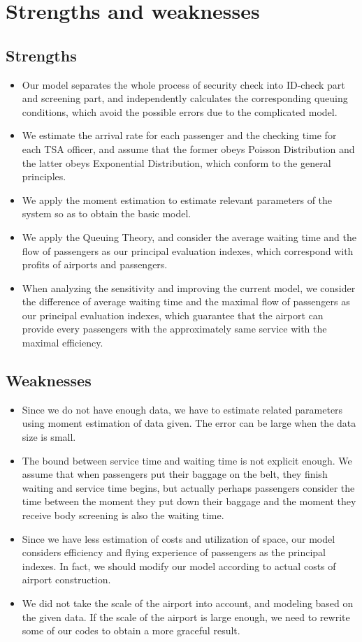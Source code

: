 \documentclass{mcmthesis}
\begin{document}
	\section{Strengths and weaknesses}
	\subsection{Strengths}
	\begin{itemize}
		\item Our model separates the whole process of security check into ID-check part and screening part, and independently calculates the corresponding queuing conditions, which avoid the possible errors due to the complicated model.
		\item We estimate the arrival rate for each passenger and the checking time for each TSA officer, and assume that the former obeys Poisson Distribution and the latter obeys Exponential Distribution, which conform to the general principles.
		\item We apply the moment estimation to estimate relevant parameters of the system so as to obtain the basic model.
		\item We apply the Queuing Theory, and consider the average waiting time and the flow of passengers as our principal evaluation indexes, which correspond with profits of airports and passengers.
		\item When analyzing the sensitivity and improving the current model, we consider the difference of average waiting time and the maximal flow of passengers as our principal evaluation indexes, which guarantee that the airport can provide every passengers with the approximately same service with the maximal efficiency.
	\end{itemize}
	\subsection{Weaknesses}
	\begin{itemize}
		\item Since we do not have enough data, we have to estimate related parameters using moment estimation of data given. The error can be large when the data size is small.
		\item The bound between service time and waiting time is not explicit enough. We assume that when passengers put their baggage on the belt, they finish waiting and service time begins, but actually perhaps passengers consider the time between the moment they put down their baggage and the moment they receive body screening is also the waiting time.\item Since we have less estimation of costs and utilization of space, our model considers efficiency and flying experience of passengers as the principal indexes. In fact, we should modify our model according to actual costs of airport construction.
		\item We did not take the scale of the airport into account, and modeling based on the given data. If the scale of the airport is large enough, we need to rewrite some of our codes to obtain a more graceful result.
	\end{itemize}
	
\end{document}
